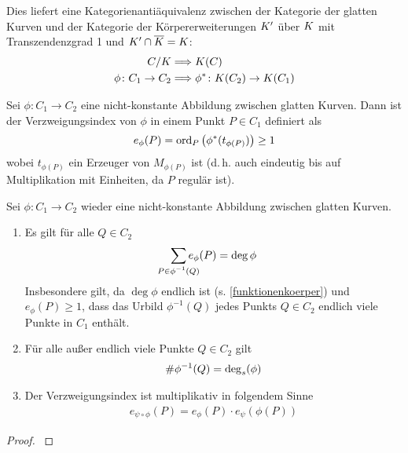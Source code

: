 \begin{Korollar}[Kategorienäquivalenz]\label{kategorienaequivalenz}
  Dies liefert eine Kategorienantiäquivalenz zwischen der Kategorie der
  glatten Kurven und der Kategorie der Körpererweiterungen $K'$ über $K$
  mit Transzendenzgrad 1 und $K'\cap\overline K=K$:
  \begin{align*}
    C/K &\Longrightarrow K(C)\\
    \phi\colon C_1\to C_2 &\Longrightarrow \phi^*\colon K(C_2)\to K(C_1)
  \end{align*}
\end{Korollar}

\begin{Definition}[Verzweigungsindex]\label{verzweigungsindex}
  Sei $\phi\colon C_1\to C_2$ eine nicht-konstante Abbildung zwischen
  glatten Kurven.
  Dann ist der Verzweigungsindex von $\phi$ in einem Punkt
  $P\in C_1$ definiert als
  \begin{gather*}
    e_\phi(P) = \operatorname{ord}_P \left( \phi^*(t_{\phi(P)}) \right) \geq 1
  \end{gather*}
  wobei $t_{\phi(P)}$ ein Erzeuger von $M_{\phi(P)}$ ist (d.\,h. auch
  eindeutig bis auf Multiplikation mit Einheiten, da $P$ regulär ist).
\end{Definition}

\begin{Satz}\label{sepgrad}
  Sei $\phi\colon C_1\to C_2$ wieder eine nicht-konstante Abbildung
  zwischen glatten Kurven. 
  \begin{enumerate}[label=\roman*)]
    \item Es gilt für alle $Q\in C_2$
      \begin{gather*}
        \sum_{\mathclap{P\in\phi^{-1}(Q)}} e_\phi(P) = \deg\phi
      \end{gather*}
      Insbesondere gilt, da $\deg\phi$ endlich ist
      (s. \ref{funktionenkoerper}) und $e_\phi(P)\geq 1$,
      dass das Urbild $\phi^{-1}(Q)$ jedes Punkts $Q\in C_2$
      endlich viele Punkte in $C_1$ enthält.
    \item Für alle außer endlich viele Punkte $Q\in C_2$ gilt
      \begin{gather*}
        \#\phi^{-1}(Q) = \operatorname{\deg}_s(\phi)
      \end{gather*}
    \item Der Verzweigungsindex ist multiplikativ
      in folgendem Sinne
      \begin{gather*}
        e_{\psi\circ\phi}(P) = e_\phi(P) \cdot e_\psi(\phi(P))
      \end{gather*}
    \end{enumerate}
    \begin{proof}
      \cite[siehe][Proposition II.2.6]{silverman}
    \end{proof}
\end{Satz}

